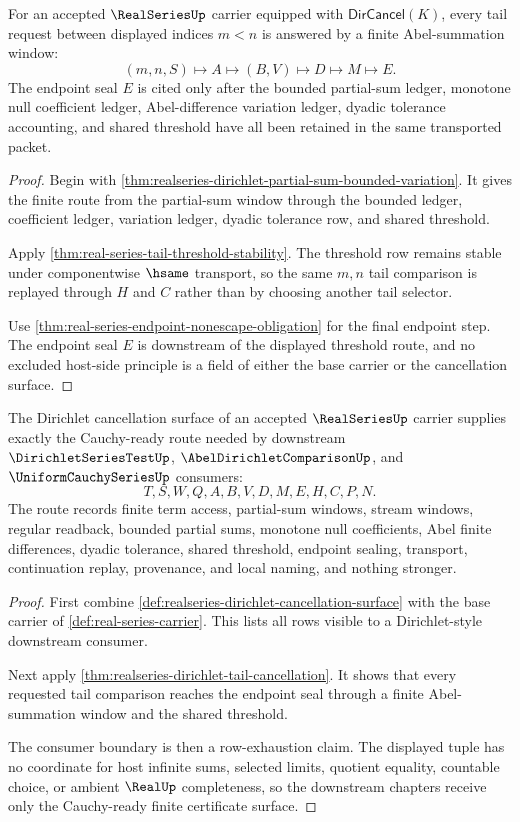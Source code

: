 \begin{theorem}
\label{thm:realseries-dirichlet-tail-cancellation}
For an accepted $\RealSeriesUp$ carrier equipped with $\mathsf{DirCancel}(K)$, every tail request between displayed indices $m<n$ is answered by a finite Abel-summation window:
$$
(m,n,S) \longmapsto A \longmapsto (B,V) \longmapsto D \longmapsto M \longmapsto E .
$$
The endpoint seal $E$ is cited only after the bounded partial-sum ledger, monotone null coefficient ledger, Abel-difference variation ledger, dyadic tolerance accounting, and shared threshold have all been retained in the same transported packet.
\end{theorem}
\begin{proof}
Begin with \autoref{thm:realseries-dirichlet-partial-sum-bounded-variation}. It gives the finite route from the partial-sum window through the bounded ledger, coefficient ledger, variation ledger, dyadic tolerance row, and shared threshold.

Apply \autoref{thm:real-series-tail-threshold-stability}. The threshold row remains stable under componentwise $\hsame$ transport, so the same $m,n$ tail comparison is replayed through $H$ and $C$ rather than by choosing another tail selector.

Use \autoref{thm:real-series-endpoint-nonescape-obligation} for the final endpoint step. The endpoint seal $E$ is downstream of the displayed threshold route, and no excluded host-side principle is a field of either the base carrier or the cancellation surface.
\end{proof}

\begin{theorem}
\label{thm:realseries-dirichlet-cauchy-readiness}
The Dirichlet cancellation surface of an accepted $\RealSeriesUp$ carrier supplies exactly the Cauchy-ready route needed by downstream $\DirichletSeriesTestUp$, $\AbelDirichletComparisonUp$, and $\UniformCauchySeriesUp$ consumers:
$$
T,S,W,Q,A,B,V,D,M,E,H,C,P,N .
$$
The route records finite term access, partial-sum windows, stream windows, regular readback, bounded partial sums, monotone null coefficients, Abel finite differences, dyadic tolerance, shared threshold, endpoint sealing, transport, continuation replay, provenance, and local naming, and nothing stronger.
\end{theorem}
\begin{proof}
First combine \autoref{def:realseries-dirichlet-cancellation-surface} with the base carrier of \autoref{def:real-series-carrier}. This lists all rows visible to a Dirichlet-style downstream consumer.

Next apply \autoref{thm:realseries-dirichlet-tail-cancellation}. It shows that every requested tail comparison reaches the endpoint seal through a finite Abel-summation window and the shared threshold.

The consumer boundary is then a row-exhaustion claim. The displayed tuple has no coordinate for host infinite sums, selected limits, quotient equality, countable choice, or ambient $\RealUp$ completeness, so the downstream chapters receive only the Cauchy-ready finite certificate surface.
\end{proof}

